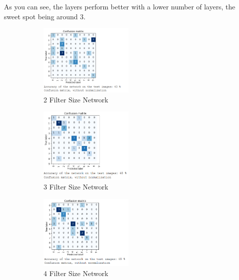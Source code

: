 \documentclass{report}
\begin{document}
    As you can see, the layers perform better with a lower number of layers, the sweet spot being around 3.
    \begin{figure}[h!]
        \centering
        \begin{subfigure}[t]{0.45\textwidth}
            \centering
            \includegraphics[width=0.5\textwidth]{2_ks}
            \caption{2 Filter Size Network}
        \end{subfigure}
        \begin{subfigure}[t]{0.45\textwidth}
            \centering
            \includegraphics[width=0.5\textwidth]{3_ks}
            \caption{3 Filter Size Network}
        \end{subfigure}
        \begin{subfigure}[t]{0.45\textwidth}
            \centering
            \includegraphics[width=0.5\textwidth]{4_ks}
            \caption{4 Filter Size Network}
        \end{subfigure}
        \begin{subfigure}[t]{0.45\textwidth}

\end{subfigure}
\end{figure}
\end{document}
